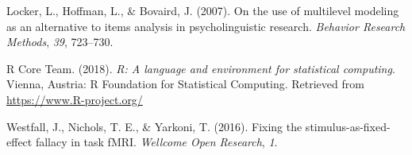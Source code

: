\documentclass[man,floatsintext]{apa6}
\begin{document}
\hypertarget{ref-locker_hoffman_bovaird_2007}{}
Locker, L., Hoffman, L., \& Bovaird, J. (2007). On the use of multilevel
modeling as an alternative to items analysis in psycholinguistic
research. \emph{Behavior Research Methods}, \emph{39}, 723--730.

\hypertarget{ref-R-base}{}
R Core Team. (2018). \emph{R: A language and environment for statistical
computing}. Vienna, Austria: R Foundation for Statistical Computing.
Retrieved from \url{https://www.R-project.org/}

\hypertarget{ref-westfall_yarkoni_2016}{}
Westfall, J., Nichols, T. E., \& Yarkoni, T. (2016). Fixing the
stimulus-as-fixed-effect fallacy in task fMRI. \emph{Wellcome Open
Research}, \emph{1}.

\endgroup
\end{document}

